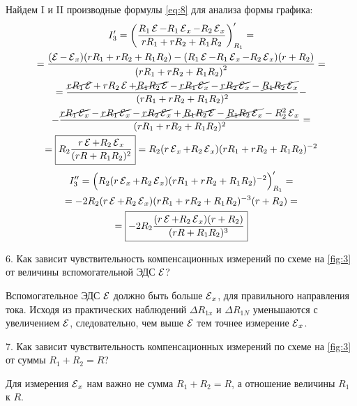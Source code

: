 Найдем I и II производные формулы \cref{eq:8} для анализа формы графика:
\begin{multline} \label{eq:4.4}
	I_3' = \left(\frac{R_1 \operatorname{\mathcal{E}} - R_1 \operatorname{\mathcal{E}}_x - R_2 \operatorname{\mathcal{E}}_x}{rR_1 + rR_2 + R_1 R_2}\right)'_{R_1} =\\= \frac{(\operatorname{\mathcal{E}} - \operatorname{\mathcal{E}}_x)(rR_1 + rR_2 + R_1 R_2) - (R_1 \operatorname{\mathcal{E}} - R_1 \operatorname{\mathcal{E}}_x - R_2 \operatorname{\mathcal{E}}_x)(r + R_2)}{\left(rR_1 + rR_2 + R_1 R_2\right)^2} = \\ = \frac{\cancel{rR_1\operatorname{\mathcal{E}}} + rR_2\operatorname{\mathcal{E}} + \cancel{R_1 R_2 \operatorname{\mathcal{E}}} - \cancel{rR_1 \operatorname{\mathcal{E}}_x} - \cancel{rR_2 \operatorname{\mathcal{E}}_x} - \cancel{R_1 R_2 \operatorname{\mathcal{E}}_x}}{(rR_1 + rR_2 + R_1 R_2)^2} -\\- \frac{\cancel{rR_1 \operatorname{\mathcal{E}}_x} - \cancel{rR_1\operatorname{\mathcal{E}}_x} - \cancel{rR_2\operatorname{\mathcal{E}}_x} + \cancel{R_1 R_2 \operatorname{\mathcal{E}}} - \cancel{R_1 R_2 \operatorname{\mathcal{E}}_x} - R_2^2 \operatorname{\mathcal{E}}_x}{(rR_1 + rR_2 + R_1 R_2)^2} = \\ = \boxed{R_2\frac{r \operatorname{\mathcal{E}} + R_2 \operatorname{\mathcal{E}}_x}{(rR + R_1 R_2)^2}} = R_2 (r\operatorname{\mathcal{E}}_x + R_2 \operatorname{\mathcal{E}}_x) (rR_1 + rR_2 + R_1 R_2) ^{-2}
\end{multline}
\begin{multline} \label{eq:4.5}
	I_3'' = \Big(R_2 (r\operatorname{\mathcal{E}}_x + R_2 \operatorname{\mathcal{E}}_x) (rR_1 + rR_2 + R_1 R_2) ^{-2}\Big)'_{R_1} = \\ = -2 R_2 (r\operatorname{\mathcal{E}} + R_2 \operatorname{\mathcal{E}}_x) (r R_1 + r R_2 + R_1 R_2)^{-3} (r+R_2) =\\= \boxed{-2R_2 \frac{(r \operatorname{\mathcal{E}} + R_2 \operatorname{\mathcal{E}}_x)(r + R_2)}{(rR + R_1 R_2)^3}}
\end{multline}




\begin{librarybox}
	6. Как зависит чувствительность компенсационных измерений по схеме на \cref{fig:3} от величины вспомогательной ЭДС $\operatorname{\mathcal{E}}$?
\end{librarybox}

Вспомогательное ЭДС $\operatorname{\mathcal{E}}$ должно быть больше $\operatorname{\mathcal{E}}_x$, для правильного направления тока. Исходя из практических наблюдений $\Delta R_{1x}$ и $\Delta R_{1N}$ уменьшаются с увеличением $\operatorname{\mathcal{E}}$, следовательно, чем выше $\operatorname{\mathcal{E}}$ тем точнее измерение $\operatorname{\mathcal{E}}_x$.

\begin{librarybox}
	7. Как зависит чувствительность компенсационных измерений по схеме на \cref{fig:3} от суммы $R_1 + R_2 = R$?
\end{librarybox}

Для измерения $\operatorname{\mathcal{E}}_x$ нам важно не сумма $R_1 + R_2 = R$, а отношение величины $R_1$ к $R$.